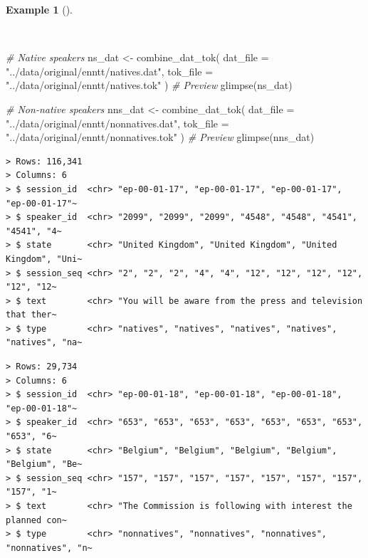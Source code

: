 \documentclass[
  letterpaper,
  DIV=11,
  numbers=noendperiod]{scrreport}
\newenvironment{Shaded}{\begin{snugshade}}{\end{snugshade}}
\newcommand{\AttributeTok}[1]{\textcolor[rgb]{0.00,0.00,0.00}{#1}}
\newcommand{\CommentTok}[1]{\textcolor[rgb]{0.00,0.00,0.00}{\textit{#1}}}
\newcommand{\FunctionTok}[1]{\textcolor[rgb]{0.00,0.00,0.00}{#1}}
\newcommand{\NormalTok}[1]{\textcolor[rgb]{0.00,0.00,0.00}{#1}}
\newcommand{\OtherTok}[1]{\textcolor[rgb]{0.00,0.00,0.00}{#1}}
\newcommand{\StringTok}[1]{\textcolor[rgb]{0.00,0.00,0.00}{#1}}
\theoremstyle{definition}
\newtheorem{example}{Example}[chapter]
\theoremstyle{remark}
\begin{document}
\begin{example}[]\protect\hypertarget{exm-cd-enntt-combine-dat-tok}{}\label{exm-cd-enntt-combine-dat-tok}

~

\begin{Shaded}
\begin{Highlighting}[]
\CommentTok{\# Native speakers}
\NormalTok{ns\_dat }\OtherTok{\textless{}{-}}
  \FunctionTok{combine\_dat\_tok}\NormalTok{(}
    \AttributeTok{dat\_file =} \StringTok{"../data/original/enntt/natives.dat"}\NormalTok{,}
    \AttributeTok{tok\_file =} \StringTok{"../data/original/enntt/natives.tok"}
\NormalTok{  )}
\CommentTok{\# Preview}
\FunctionTok{glimpse}\NormalTok{(ns\_dat)}

\CommentTok{\# Non{-}native speakers}
\NormalTok{nns\_dat }\OtherTok{\textless{}{-}}
  \FunctionTok{combine\_dat\_tok}\NormalTok{(}
    \AttributeTok{dat\_file =} \StringTok{"../data/original/enntt/nonnatives.dat"}\NormalTok{,}
    \AttributeTok{tok\_file =} \StringTok{"../data/original/enntt/nonnatives.tok"}
\NormalTok{  )}
\CommentTok{\# Preview}
\FunctionTok{glimpse}\NormalTok{(nns\_dat)}
\end{Highlighting}
\end{Shaded}

\begin{verbatim}
> Rows: 116,341
> Columns: 6
> $ session_id  <chr> "ep-00-01-17", "ep-00-01-17", "ep-00-01-17", "ep-00-01-17"~
> $ speaker_id  <chr> "2099", "2099", "2099", "4548", "4548", "4541", "4541", "4~
> $ state       <chr> "United Kingdom", "United Kingdom", "United Kingdom", "Uni~
> $ session_seq <chr> "2", "2", "2", "4", "4", "12", "12", "12", "12", "12", "12~
> $ text        <chr> "You will be aware from the press and television that ther~
> $ type        <chr> "natives", "natives", "natives", "natives", "natives", "na~
\end{verbatim}

\begin{verbatim}
> Rows: 29,734
> Columns: 6
> $ session_id  <chr> "ep-00-01-18", "ep-00-01-18", "ep-00-01-18", "ep-00-01-18"~
> $ speaker_id  <chr> "653", "653", "653", "653", "653", "653", "653", "653", "6~
> $ state       <chr> "Belgium", "Belgium", "Belgium", "Belgium", "Belgium", "Be~
> $ session_seq <chr> "157", "157", "157", "157", "157", "157", "157", "157", "1~
> $ text        <chr> "The Commission is following with interest the planned con~
> $ type        <chr> "nonnatives", "nonnatives", "nonnatives", "nonnatives", "n~
\end{verbatim}

\end{example}
\end{document}
